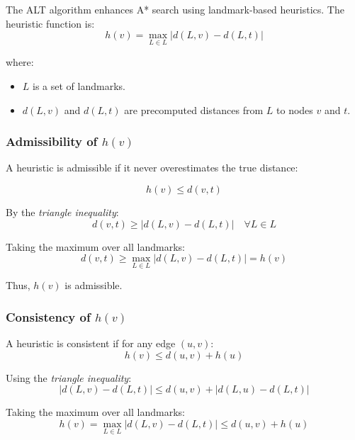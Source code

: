 \begin{appendices}
The ALT algorithm enhances A* search using landmark-based heuristics. The heuristic function is:
\begin{equation}
	h(v) = \max_{L \in \textit{L}} \left| d(L, v) - d(L, t) \right|
\end{equation}

where:
\begin{itemize}
	\item $ L $ is a set of landmarks.
	\item $ d(L, v) $ and $ d(L, t) $ are precomputed distances from $ L $ to nodes $ v $ and  $t $.
\end{itemize}

\subsubsection{Admissibility of $ h(v) $}

A heuristic is admissible if it never overestimates the true distance:  

\begin{equation} h(v) \leq d(v, t) \end{equation}

By the \textit{triangle inequality}: \begin{equation} d(v, t) \geq |d(L, v) - d(L, t)| \quad \forall L \in L \end{equation}

Taking the maximum over all landmarks:
\begin{equation}
	d(v, t) \geq \max_{L \in \textit{L}} \left| d(L, v) - d(L, t) \right| = h(v)
\end{equation}

Thus, $ h(v) $ is admissible.

\subsubsection{Consistency of $ h(v) $}

A heuristic is consistent if for any edge $ (u, v) $:
\begin{equation}
	h(v) \leq d(u, v) + h(u)
\end{equation}


Using the \textit{triangle inequality}:
\begin{equation} 
	|d(L, v) - d(L, t)| \leq d(u, v) + |d(L, u) - d(L, t)| 
\end{equation}

Taking the maximum over all landmarks:
\begin{equation}
	h(v) = \max_{L \in \textit{L}} \left| d(L, v) - d(L, t) \right| \leq d(u, v) + h(u)
\end{equation}



\end{appendices}
